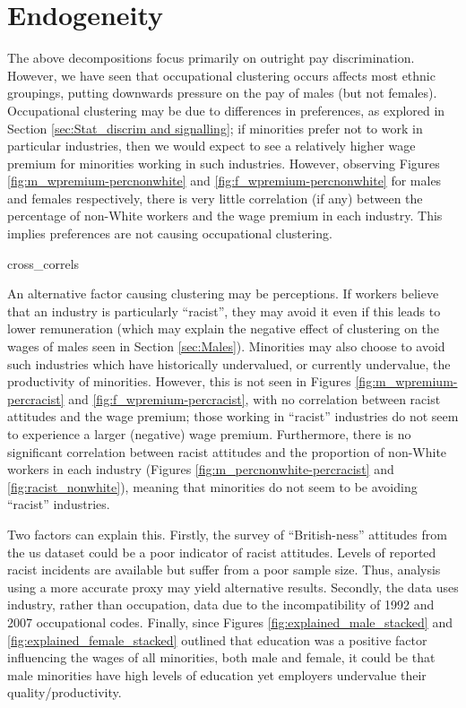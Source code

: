 \documentclass[class=article, crop=false]{standalone}
\begin{document}
\section{Endogeneity}
\label{sec:endogeneity}
The above decompositions focus primarily on outright pay discrimination. However, we have seen that occupational clustering occurs affects most ethnic groupings, putting downwards pressure on the pay of males (but not females). Occupational clustering may be due to differences in preferences, as explored in Section \ref{sec:Stat_discrim and signalling}; if minorities prefer not to work in particular industries, then we would expect to see a relatively higher wage premium for minorities working in such industries. However, observing Figures \ref{fig:m_wpremium-percnonwhite} and \ref{fig:f_wpremium-percnonwhite} for males and females respectively, there is very little correlation (if any) between the percentage of non-White workers and the wage premium in each industry. This implies preferences are not causing occupational clustering.

{cross_correls}
%

An alternative factor causing clustering may be perceptions. If workers believe that an industry is particularly \enquote{racist}, they may avoid it even if this leads to lower remuneration (which may explain the negative effect of clustering on the wages of males seen in Section \ref{sec:Males}). Minorities may also choose to avoid such industries which have historically undervalued, or currently undervalue, the productivity of minorities. However, this is not seen in Figures \ref{fig:m_wpremium-percracist} and \ref{fig:f_wpremium-percracist}, with no correlation between racist attitudes and the wage premium; those working in \enquote{racist} industries do not seem to experience a larger (negative) wage premium. Furthermore, there is no significant correlation between racist attitudes and the proportion of non-White workers in each industry (Figures \ref{fig:m_percnonwhite-percracist} and \ref{fig:racist_nonwhite}), meaning that minorities do not seem to be avoiding \enquote{racist} industries.

Two factors can explain this. Firstly, the survey of \enquote{British-ness} attitudes from the \acrlong{us} dataset could be a poor indicator of racist attitudes. Levels of reported racist incidents are available but suffer from a poor sample size. Thus, analysis using a more accurate proxy may yield alternative results. Secondly, the data uses industry, rather than occupation, data due to the incompatibility of 1992 and 2007 occupational codes. Finally, since Figures \ref{fig:explained_male_stacked} and \ref{fig:explained_female_stacked} outlined that education was a positive factor influencing the wages of all minorities, both male and female, it could be that male minorities have high levels of education yet employers undervalue their quality/productivity.
\end{document}
